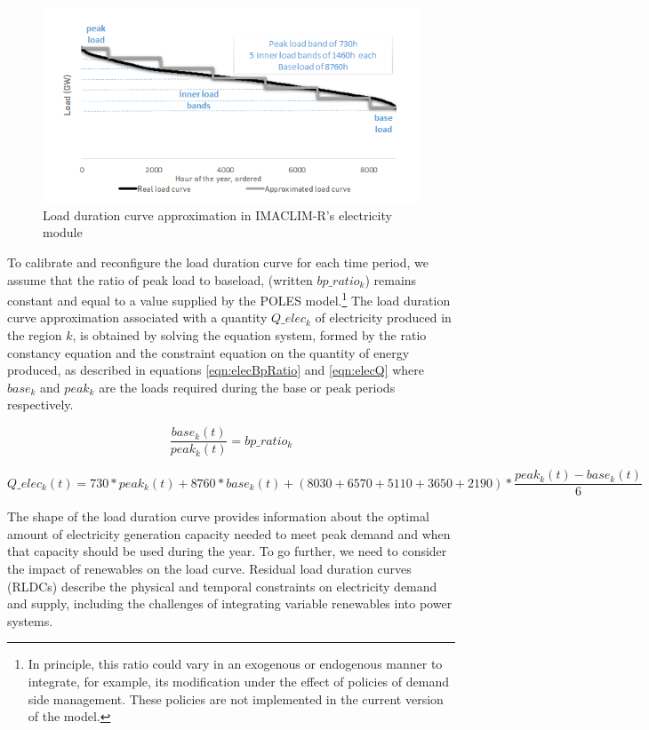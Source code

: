\begin{figure}
    \includegraphics{figures&tables/LDC.png}
    \caption{Load duration curve approximation in IMACLIM-R's electricity module}
    \centering
    \label{fig:LDC}
\end{figure}


To calibrate and reconfigure the load duration curve for each time period, we assume that the ratio of peak load to baseload, (written $bp\_ratio_k$) remains constant and equal to a value supplied by the POLES model.\footnote{
    In principle, this ratio could vary in an exogenous or endogenous manner to integrate, for example, its modification under the effect of policies of demand side management. These policies are not implemented in the current version of the model.
}
The load duration curve approximation associated with a quantity $Q\_elec_k$ of electricity produced in the region $k$, is obtained by solving the equation system, formed by the ratio constancy equation and the constraint equation on the quantity of energy produced, as described in equations \ref{eqn:elecBpRatio} and  \ref{eqn:elecQ}
where $base_k$ and $peak_k$ are the loads required during the base or peak periods respectively.

\begin{dmath}
    \frac{base_k(t)}{peak_k(t)} = bp\_ratio_k
    \label{eqn:elecBpRatio}
\end{dmath}

\begin{dmath}
    Q\_elec_k(t) =
    730*peak_k(t) +
    8760 * base_k(t)  + (8030 + 6570 + 5110 + 3650 + 2190)*\frac{peak_k(t) - base_k(t)}{6} 
    \label{eqn:elecQ}
\end{dmath}

The shape of the load duration curve provides information about the optimal amount of electricity generation capacity needed to meet peak demand and when that capacity should be used during the year. To go further, we need to consider the impact of renewables on the load curve. Residual load duration curves (RLDCs) describe the physical and temporal constraints on electricity demand and supply, including the challenges of integrating variable renewables into power systems.

